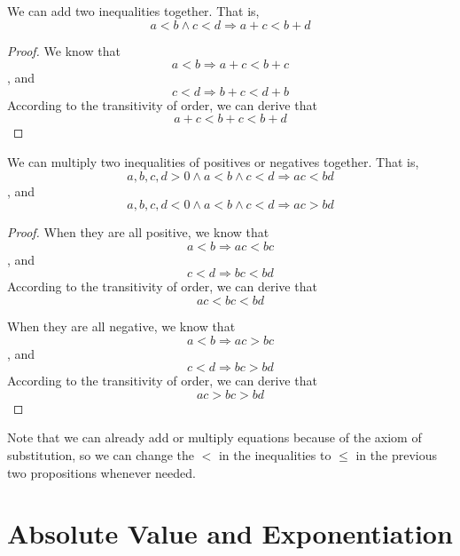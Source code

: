 \begin{prop} \label{prop.4.2.add.ineq}
We can add two inequalities together. That is,
\[
a<b \wedge c<d \Longrightarrow a+c<b+d
\]
\end{prop}
\begin{proof}
We know that
\[
a<b \Longrightarrow a+c<b+c 
\]
, and
\[
c<d \Longrightarrow b+c<d+b 
\]
According to the transitivity of order, we can derive that
\[
a+c<b+c<b+d
\]
\end{proof}

\begin{prop} \label{prop.4.2.multiply.ineq}
We can multiply two inequalities of positives or negatives together. That is,
\[
a,b,c,d >0 \wedge a<b \wedge c<d \Longrightarrow ac<bd
\]
, and
\[
a,b,c,d <0 \wedge a<b \wedge c<d \Longrightarrow ac>bd
\]
\end{prop}
\begin{proof}
When they are all positive,
we know that
\[
a<b \Longrightarrow ac<bc
\]
, and
\[
c<d \Longrightarrow bc<bd
\]
According to the transitivity of order, we can derive that
\[
ac<bc<bd
\]

When they are all negative,
we know that
\[
a<b \Longrightarrow ac>bc
\]
, and
\[
c<d \Longrightarrow bc>bd
\]
According to the transitivity of order, we can derive that
\[
ac>bc>bd
\]
\end{proof}

Note that we can already add or multiply equations because of the axiom of substitution, so we can change 
the $<$ in the inequalities to $\leq$ in the previous two propositions whenever needed.

\section{Absolute Value and Exponentiation}

